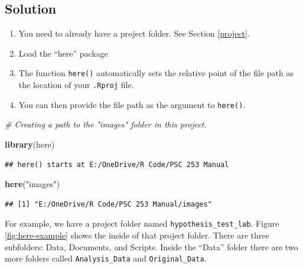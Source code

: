 \documentclass[
]{book}
\newenvironment{Shaded}{\begin{snugshade}}{\end{snugshade}}
\newcommand{\CommentTok}[1]{\textcolor[rgb]{0.56,0.35,0.01}{\textit{#1}}}
\newcommand{\FunctionTok}[1]{\textcolor[rgb]{0.13,0.29,0.53}{\textbf{#1}}}
\newcommand{\NormalTok}[1]{#1}
\newcommand{\StringTok}[1]{\textcolor[rgb]{0.31,0.60,0.02}{#1}}
\providecommand{\tightlist}{%
  \setlength{\itemsep}{0pt}\setlength{\parskip}{0pt}}
\begin{document}
\hypertarget{solution-8}{%
\subsection{Solution}\label{solution-8}}

\begin{enumerate}
\def\labelenumi{\arabic{enumi}.}
\tightlist
\item
  You need to already have a project folder. See Section \ref{project}.
\item
  Load the ``here'' package
\item
  The function \texttt{here()} automatically sets the relative point of the file path as the location of your \texttt{.Rproj} file.
\item
  You can then provide the file path as the argument to \texttt{here()}.
\end{enumerate}

\begin{Shaded}
\begin{Highlighting}[]
\CommentTok{\# Creating a path to the "images" folder in this project.}

\FunctionTok{library}\NormalTok{(here)}
\end{Highlighting}
\end{Shaded}

\begin{verbatim}
## here() starts at E:/OneDrive/R Code/PSC 253 Manual
\end{verbatim}

\begin{Shaded}
\begin{Highlighting}[]
\FunctionTok{here}\NormalTok{(}\StringTok{"images"}\NormalTok{)}
\end{Highlighting}
\end{Shaded}

\begin{verbatim}
## [1] "E:/OneDrive/R Code/PSC 253 Manual/images"
\end{verbatim}

For example, we have a project folder named \texttt{hypothesis\_test\_lab}. Figure \ref{fig:here-example} shows the inside of that project folder. There are three subfolders: Data, Documents, and Scripts. Inside the ``Data'' folder there are two more folders called \texttt{Analysis\_Data} and \texttt{Original\_Data}.
\end{document}
